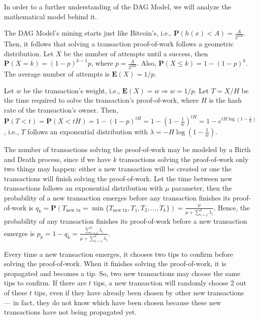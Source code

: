 In order to a further understanding of the DAG Model, we will analyze the mathematical model behind it.

The DAG Model's mining starts just like Bitcoin's, i.e., $\mathbf{P}(h(x) < A) = \frac{A}{2^{256}}$. Then, it follows that solving a transaction proof-of-work follows a geometric distribution. Let $X$ be the number of attempts until a success, then $\mathbf{P}(X=k) = (1-p)^{k-1}p$, where $p=\frac{A}{2^{256}}$. Also, $\mathbf{P}(X \leq k)=1-(1-p)^k$. The average number of attempts is $\mathbf{E}(X)=1/p$.

Let $w$ be the transaction's weight, i.e., $\mathbf{E}(X)=w \Rightarrow w = 1/p$. Let $T = X/H$ be the time required to solve the transaction's proof-of-work, where $H$ is the hash rate of the transaction's owner. Then, $\mathbf{P}(T < t) = \mathbf{P}(X < tH) = 1 - (1 - p)^{tH} = 1 - \left( 1 - \frac{1}{w} \right)^{tH} = 1 - e^{tH \log\left(1 - \frac{1}{w} \right)}$, i.e., $T$ follows an exponential distribution with $\lambda = -H \log\left(1 - \frac{1}{w} \right)$.


The number of transactions solving the proof-of-work may be modeled by a Birth and Death process, since if we have $k$ transactions solving the proof-of-work only two things may happen: either a new transaction will be created or one the transactions will finish solving the proof-of-work. Let the time between new transactions follows an exponential distribution with $\mu$ parameter, then the probability of a new transaction emerges before any transaction finishes its proof-of-work is $q_k = \mathbf{P}(T_{\text{new tx}} = \min\{T_{\text{new tx}}, T_1, T_2, \dots, T_k\}) = \frac{\mu}{\mu + \sum_{i=1}^k \lambda_i}$. Hence, the probability of any transaction finishes its proof-of-work before a new transaction emerges is $p_k = 1 - q_k = \frac{\sum_{i=1}^k \lambda_i}{\mu + \sum_{i=1}^k \lambda_i}$.

Every time a new transaction emerges, it chooses two tips to confirm before solving the proof-of-work. When it finishes solving the proof-of-work, it is propagated and becomes a tip. So, two new transactions may choose the same tips to confirm. If there are $t$ tips, a new transaction will randomly choose 2 out of these $t$ tips, even if they have already been chosen by other new transactions --- in fact, they do not know which have been chosen because these new transactions have not being propagated yet.

